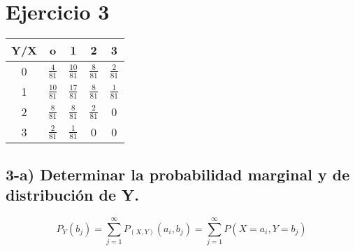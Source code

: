 \documentclass[12pt]{article}
\begin{document}
\section*{Ejercicio 3}


\begin{center}
    \renewcommand{\arraystretch}{1.5}
    \begin{tabular}{|c|c|c|c|c|}
        \hline
        Y/X & o               & 1               & 2              & 3
        \\
        \hline
        0   & $\frac{4}{81}$  & $\frac{10}{81}$ & $\frac{8}{81}$ & $\frac{2}{81} $
        \\
        \hline
        1   & $\frac{10}{81}$ & $\frac{17}{81}$ & $\frac{8}{81}$ & $\frac{1}{81}$
        \\
        \hline
        2   & $\frac{8}{81}$  & $\frac{8}{81}$  & $\frac{2}{81}$ & 0
        \\
        \hline
        3   & $\frac{2}{81}$  & $\frac{1}{81}$  & 0              & 0
        \\
        \hline
    \end{tabular}
\end{center}

\subsection*{ 3-a) Determinar la probabilidad marginal y de distribuci\'on de Y.}

\begin{equation*}
    P_Y\left(b_j\right) =  \sum_{j=1}^{\infty} P_{\left(X,Y\right)} \left(a_i, b_j\right)
                             =  \sum_{j=1}^{\infty} P\left(X=a_i,Y=b_j\right)
\end{equation*}
\end{document}

